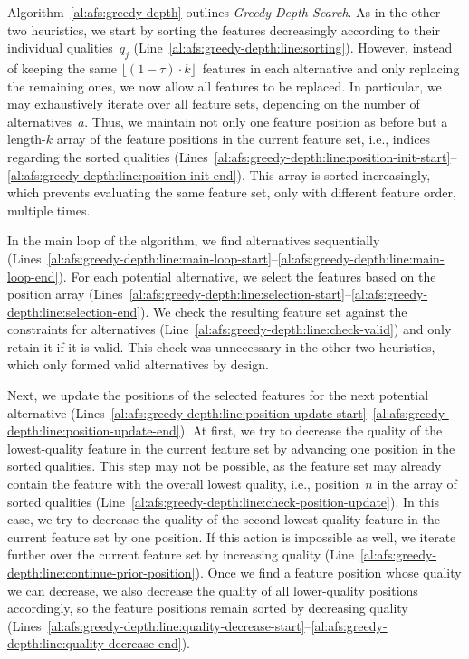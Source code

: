 \documentclass{article}
\theoremstyle{definition}
\begin{document}
Algorithm~\ref{al:afs:greedy-depth} outlines \emph{Greedy Depth Search}.
As in the other two heuristics, we start by sorting the features decreasingly according to their individual qualities~$q_j$ (Line~\ref{al:afs:greedy-depth:line:sorting}).
However, instead of keeping the same $\lfloor (1 - \tau) \cdot k \rfloor$~features in each alternative and only replacing the remaining ones, we now allow all features to be replaced.
In particular, we may exhaustively iterate over all feature sets, depending on the number of alternatives~$a$.
Thus, we maintain not only one feature position as before but a length-$k$ array of the feature positions in the current feature set, i.e., indices regarding the sorted qualities (Lines~\ref{al:afs:greedy-depth:line:position-init-start}--\ref{al:afs:greedy-depth:line:position-init-end}).
This array is sorted increasingly, which prevents evaluating the same feature set, only with different feature order, multiple times.

In the main loop of the algorithm, we find alternatives sequentially
(Lines~\ref{al:afs:greedy-depth:line:main-loop-start}--\ref{al:afs:greedy-depth:line:main-loop-end}).
For each potential alternative, we select the features based on the position array (Lines~\ref{al:afs:greedy-depth:line:selection-start}--\ref{al:afs:greedy-depth:line:selection-end}).
We check the resulting feature set against the constraints for alternatives (Line~\ref{al:afs:greedy-depth:line:check-valid}) and only retain it if it is valid.
This check was unnecessary in the other two heuristics, which only formed valid alternatives by design.

Next, we update the positions of the selected features for the next potential alternative (Lines~\ref{al:afs:greedy-depth:line:position-update-start}--\ref{al:afs:greedy-depth:line:position-update-end}).
At first, we try to decrease the quality of the lowest-quality feature in the current feature set by advancing one position in the sorted qualities.
This step may not be possible, as the feature set may already contain the feature with the overall lowest quality, i.e., position~$n$ in the array of sorted qualities (Line~\ref{al:afs:greedy-depth:line:check-position-update}).
In this case, we try to decrease the quality of the second-lowest-quality feature in the current feature set by one position.
If this action is impossible as well, we iterate further over the current feature set by increasing quality (Line~\ref{al:afs:greedy-depth:line:continue-prior-position}).
Once we find a feature position whose quality we can decrease, we also decrease the quality of all lower-quality positions accordingly, so the feature positions remain sorted by decreasing quality (Lines~\ref{al:afs:greedy-depth:line:quality-decrease-start}--\ref{al:afs:greedy-depth:line:quality-decrease-end}).
\end{document}
